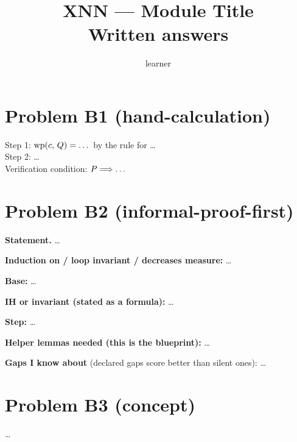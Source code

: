 \documentclass[11pt]{article}
\title{XNN --- Module Title \\ \large Written answers}
\author{learner}
\date{}
\begin{document}
\maketitle


\section*{Problem B1 (hand-calculation)}\label{ans:B1}
\begin{answer}
Step 1: $\mathrm{wp}(c,\,Q) = \dots$ \quad by the rule for \dots \\
Step 2: \dots \\
Verification condition: $P \Longrightarrow \dots$
\end{answer}

\section*{Problem B2 (informal-proof-first)}\label{ans:B2}
\begin{answer}
\textbf{Statement.} \dots

\textbf{Induction on / loop invariant / decreases measure:} \dots

\textbf{Base:} \dots

\textbf{IH or invariant (stated as a formula):} \dots

\textbf{Step:} \dots

\textbf{Helper lemmas needed (this is the blueprint):} \dots

\textbf{Gaps I know about} (declared gaps score better than silent ones): \dots
\end{answer}

\section*{Problem B3 (concept)}\label{ans:B3}
\begin{answer}
\dots
\end{answer}
\end{document}
